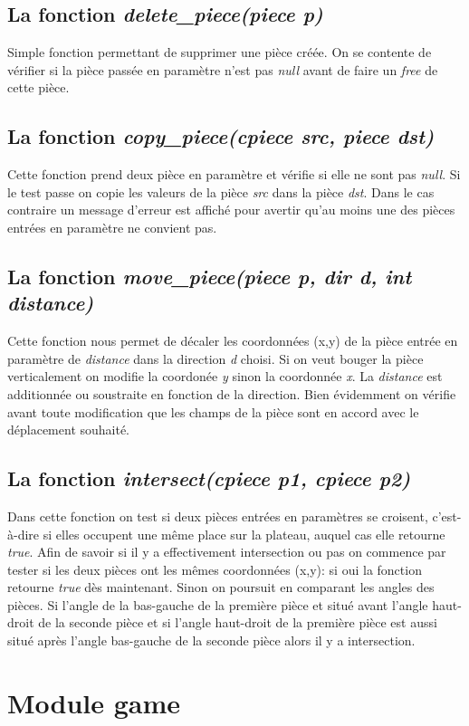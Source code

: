\documentclass{report}
\begin{document}
\section*{La fonction \textit{delete\_piece(piece p)}}
Simple fonction permettant de supprimer une pièce créée. On se contente de vérifier si la pièce passée en paramètre n'est pas \textit{null} avant de faire un \textit{free} de cette pièce.
\section*{La fonction \textit{copy\_piece(cpiece src, piece dst)}}
Cette fonction prend deux pièce en paramètre et vérifie si elle ne sont pas \textit{null}. Si le test passe on copie les valeurs de la pièce \textit{src} dans la pièce \textit{dst}. Dans le cas contraire un message d'erreur est affiché pour avertir qu'au moins une des pièces entrées en paramètre ne convient pas.
\section*{La fonction \textit{move\_piece(piece p, dir d, int distance)}}
Cette fonction nous permet de décaler les coordonnées (x,y) de la pièce entrée en paramètre de \textit{distance} dans la direction \textit{d} choisi. Si on veut bouger la pièce verticalement on modifie la coordonée \textit{y} sinon la coordonnée \textit{x}. La \textit{distance} est additionnée ou soustraite en fonction de la direction. Bien évidemment on vérifie avant toute modification que les champs de la pièce sont en accord avec le déplacement souhaité.
\section*{La fonction \textit{intersect(cpiece p1, cpiece p2)}}
Dans cette fonction on test si deux pièces entrées en paramètres se croisent, c'est-à-dire si elles occupent une même place sur la plateau, auquel cas elle retourne \textit{true}. Afin de savoir si il y a effectivement intersection ou pas on commence par tester si les deux pièces ont les mêmes coordonnées (x,y): si oui la fonction retourne \textit{true} dès maintenant. Sinon on poursuit en comparant les angles des pièces. Si l'angle de la bas-gauche de la première pièce et situé avant l'angle haut-droit de la seconde pièce et si l'angle haut-droit de la première pièce est aussi situé après l'angle bas-gauche de la seconde pièce alors il y a intersection.

\chapter{Module game}
\end{document}
